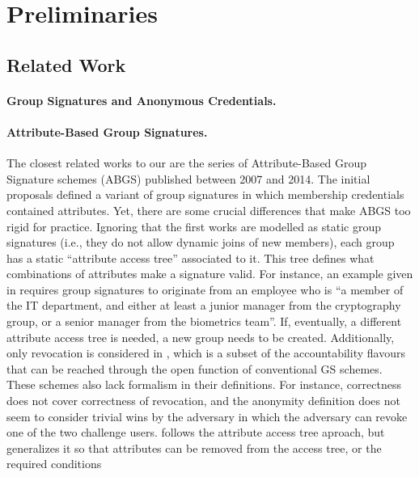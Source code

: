 \section{Preliminaries}
\label{sec:preliminaries}

\iffalse
\subsection{Related Work}
\label{ssec:related}

\paragraph{Group Signatures and Anonymous Credentials.} %

\paragraph{Attribute-Based Group Signatures.} %
The closest related works to our \GSAC are the series of Attribute-Based Group
Signature schemes (ABGS) published between 2007 and 2014. The initial proposals
\cite{khad07a,khad07b} defined a variant of group signatures in which membership
credentials contained attributes. Yet, there are some
crucial differences that make ABGS too rigid for practice. Ignoring that the
first works \cite{khad07a,khad07b} are modelled as static group signatures
(i.e., they do not allow dynamic joins of new members), each group has a static
``attribute access tree'' associated to it. This tree defines what combinations
of attributes make a signature valid. For instance, an example given in
\cite{khad07b} requires group signatures to originate from an employee who is
``a member of the IT department, and either at least a junior manager from the
cryptography group, or a senior manager from the biometrics team''. If,
eventually, a different attribute access tree is needed, a new group needs to
be created. Additionally, only revocation is considered in \cite{khad07b},
which is a subset of the accountability flavours that can be reached through
the open function of conventional GS schemes. These schemes also lack formalism
in their definitions. For instance, correctness does not cover correctness of
revocation, and the anonymity definition does not seem to consider trivial wins
by the adversary in which the adversary can revoke one of the two challenge
users.
%
\cite{emo09} follows the attribute access tree aproach, but generalizes it so
that attributes can be removed from the access tree, or the required conditions
